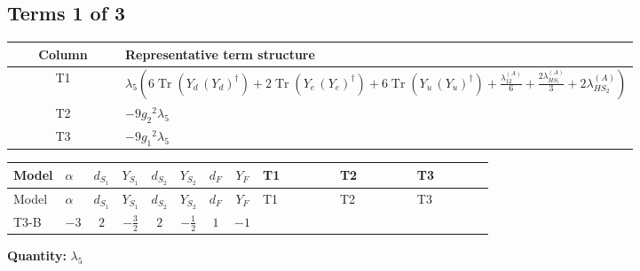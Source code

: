 \documentclass[8pt]{article}
\begin{document}
\begin{landscape}
\subsection*{Terms 1 of 3}
\begin{center}
\begin{tabular}{@{}c >{\raggedright\arraybackslash}p{0.82\linewidth}@{}}
\toprule
Column & Representative term structure \\
\midrule
T1 & \(\displaystyle {\lambda_5} \left(6 \operatorname{Tr}\!\left({Y_d}\,\left({Y_d}\right)^{\dagger}\right)+2 \operatorname{Tr}\!\left({Y_e}\,\left({Y_e}\right)^{\dagger}\right)+6 \operatorname{Tr}\!\left({Y_u}\,\left({Y_u}\right)^{\dagger}\right)+\frac{{\lambda_{12}^{(A)}}}{6}+\frac{2 {\lambda_{HS_1}^{(A)}}}{3}+2 {\lambda_{HS_2}^{(A)}}\right)\) \\
\midrule
T2 & \(\displaystyle -9 {g_2}^2 {\lambda_5}\) \\
\midrule
T3 & \(\displaystyle -9 {g_1}^2 {\lambda_5}\) \\
\midrule
\bottomrule
\end{tabular}
\end{center}
\smallskip
\tiny
\begin{longtable}{@{}llcccccc >{\raggedright\arraybackslash}p{0.21\linewidth} >{\raggedright\arraybackslash}p{0.21\linewidth} >{\raggedright\arraybackslash}p{0.21\linewidth}@{}}
\toprule
Model & $\alpha$ & $d_{S_1}$ & $Y_{S_1}$ & $d_{S_2}$ & $Y_{S_2}$ & $d_F$ & $Y_F$ & T1 & T2 & T3 \\
\midrule
\endfirsthead
\toprule
Model & $\alpha$ & $d_{S_1}$ & $Y_{S_1}$ & $d_{S_2}$ & $Y_{S_2}$ & $d_F$ & $Y_F$ & T1 & T2 & T3 \\
\midrule
\endhead
T3-B & $-3$ & $2$ & $-\frac{3}{2}$ & $2$ & $-\frac{1}{2}$ & $1$ & $-1$ & \scriptsize\adjustbox{max width=\linewidth}{$\begin{gathered} {\lambda_5} \left(6 \operatorname{Tr}\!\left({Y_d}\,\left({Y_d}\right)^{\dagger}\right)+2 \operatorname{Tr}\!\left({Y_e}\,\left({Y_e}\right)^{\dagger}\right)+6 \operatorname{Tr}\!\left({Y_u}\,\left({Y_u}\right)^{\dagger}\right)+\frac{{\lambda_{12}^{(A)}}}{6}+\frac{2 {\lambda_{HS_1}^{(A)}}}{3}+2 {\lambda_{HS_2}^{(A)}}\right)\end{gathered}$} & \scriptsize\adjustbox{max width=\linewidth}{$\begin{gathered} -9 {g_2}^2 {\lambda_5}\end{gathered}$} & \scriptsize\adjustbox{max width=\linewidth}{$\begin{gathered} -9 {g_1}^2 {\lambda_5}\end{gathered}$} \\
\midrule
\bottomrule
\end{longtable}
\clearpage
\noindent\textbf{Quantity: }$\lambda_5$\par\smallskip

\end{landscape}
\end{document}
